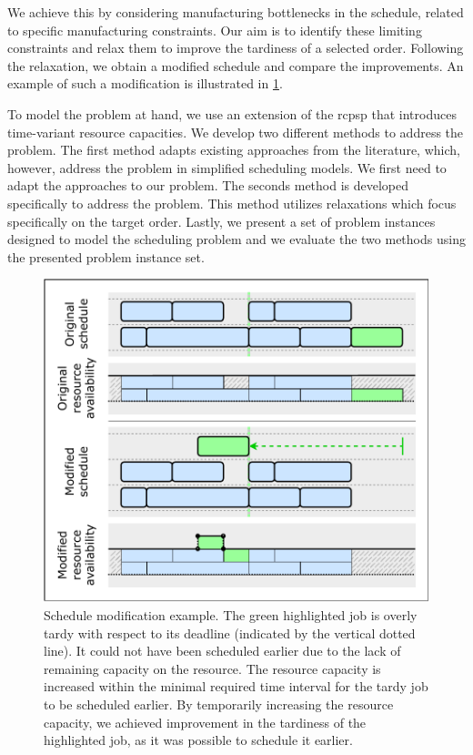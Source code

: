 We achieve this by considering manufacturing bottlenecks in the schedule,
related to specific manufacturing constraints.
Our aim is to identify these limiting constraints
and relax them to improve the tardiness of a selected order.
Following the relaxation, we obtain a modified schedule and compare the improvements.
An example of such a modification is illustrated in \cref{fig:schedule-change}.

To model the problem at hand, we use an extension of the \acf{rcpsp}
that introduces time-variant resource capacities.
We develop two different methods to address the problem.
The first method adapts existing approaches from the literature,
which, however, address the problem in simplified scheduling models.
We first need to adapt the approaches to our problem.
The seconds method is developed specifically to address the problem.
This method utilizes relaxations which focus specifically on the target order.
Lastly, we present a set of problem instances designed to model the scheduling problem
and we evaluate the two methods using the presented problem instance set.

\begin{figure}[tb]
    \centering
    \includegraphics[width=\textwidth]{img/Schedule-Change.pdf}
    \caption{
        Schedule modification example.
        The green highlighted job is overly tardy with respect to its deadline (indicated by the vertical dotted line).
        It could not have been scheduled earlier due to the lack of remaining capacity on the resource.
        The resource capacity is increased within the minimal required time interval
        for the tardy job to be scheduled earlier.
        By temporarily increasing the resource capacity,
        we achieved improvement in the tardiness of the highlighted job,
        as it was possible to schedule it earlier.
        }
    \label{fig:schedule-change}
\end{figure}

